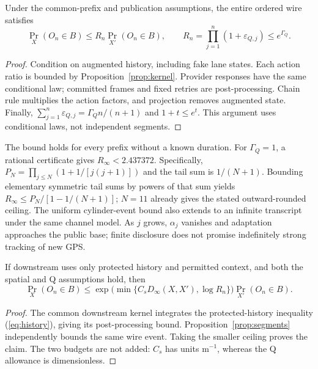 \begin{proposition}\label{prop:segments}
Under the common-prefix and publication assumptions, the entire ordered wire satisfies
\begin{equation}
\Pr_X(O_n\in B)\le R_n\Pr_{X'}(O_n\in B),\qquad
R_n=\prod_{j=1}^n(1+\varepsilon_{Q,j})\le e^{\Gamma_Q}. \label{eq:segments}
\end{equation}
\end{proposition}
\begin{proof}
Condition on augmented history, including fake lane states. Each action ratio is bounded
by Proposition~\ref{prop:kernel}. Provider responses have the same conditional law;
committed frames and fixed retries are post-processing. Chain rule multiplies the
action factors, and projection removes augmented state. Finally,
$\sum_{j=1}^n\varepsilon_{Q,j}=\Gamma_Q n/(n+1)$ and $1+t\le e^t$.
This argument uses conditional laws, not independent segments.
\end{proof}

The bound holds for every prefix without a known duration. For $\Gamma_Q=1$, a
rational certificate gives $R_\infty<2.437372$. Specifically,
$P_N=\prod_{j\le N}(1+1/[j(j+1)])$ and the tail sum is $1/(N+1)$.
Bounding elementary symmetric tail sums by powers of that sum yields
$R_\infty\le P_N/[1-1/(N+1)]$; $N=11$ already gives the stated outward-rounded
ceiling. The uniform cylinder-event bound also extends to an infinite transcript
under the same channel model. As $j$ grows, $\alpha_j$ vanishes and adaptation
approaches the public base; finite disclosure does not promise indefinitely
strong tracking of new GPS.

\begin{theorem}\label{thm:endtoend}
If downstream uses only protected history and permitted context, and both the
spatial and Q assumptions hold, then
\begin{equation}
\Pr_X(O_n\in B)\le
\exp\!\bigl(\min\{C_sD_\infty(X,X'),\log R_n\}\bigr)
\Pr_{X'}(O_n\in B). \label{eq:endtoend}
\end{equation}
\end{theorem}
\begin{proof}
The common downstream kernel integrates the protected-history inequality
(\ref{eq:history}), giving its post-processing bound. Proposition~\ref{prop:segments}
independently bounds the same wire event. Taking the smaller ceiling proves the
claim. The two budgets are not added: $C_s$ has units $\mathrm m^{-1}$,
whereas the Q allowance is dimensionless.
\end{proof}


